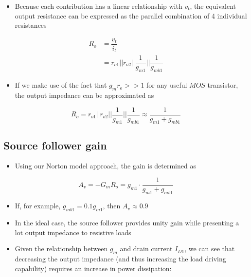 \documentclass[11pt]{article}
\providecommand{\tightlist}{%
      \setlength{\itemsep}{0pt}\setlength{\parskip}{0pt}}
\begin{document}
\begin{itemize}
\tightlist
\item
  Because each contribution has a linear relationship with \(v_t\), the
  equivalent output resistance can be expressed as the parallel
  combination of 4 individual resistances
\end{itemize}

\begin{align}
R_o &= \dfrac{v_t}{i_t} \\
&= r_{o1}||r_{o2}||\dfrac{1}{g_{m1}}||\dfrac{1}{g_{mb1}}
\end{align}

    \begin{itemize}
\tightlist
\item
  If we make use of the fact that \(g_m r_o >> 1\) for any useful
  \(MOS\) transistor, the output impedance can be approximated as
\end{itemize}

\begin{equation}
R_o = r_{o1}||r_{o2}||\dfrac{1}{g_{m1}}||\dfrac{1}{g_{mb1}} \approx \boxed{ \dfrac{1}{g_{m1} + g_{mb1}} }
\end{equation}

    \hypertarget{source-follower-gain}{%
\subsection{Source follower gain}\label{source-follower-gain}}

    \begin{itemize}
\tightlist
\item
  Using our Norton model approach, the gain is determined as
\end{itemize}

\begin{equation}
A_v = -G_m R_o = g_{m1}\cdot \dfrac{1}{g_{m1} + g_{mb1}}
\end{equation}

\begin{itemize}
\tightlist
\item
  If, for example, \(g_{mb1} = 0.1 g_{m1}\), then \(A_v \approx 0.9\)
\item
  In the ideal case, the source follower provides unity gain while
  presenting a lot output impedance to resistive loads
\item
  Given the relationship between \(g_m\) and drain current \(I_{D1}\),
  we can see that decreasing the output impedance (and thus increasing
  the load driving capability) requires an increase in power
  dissipation:
\end{itemize}
\end{document}
